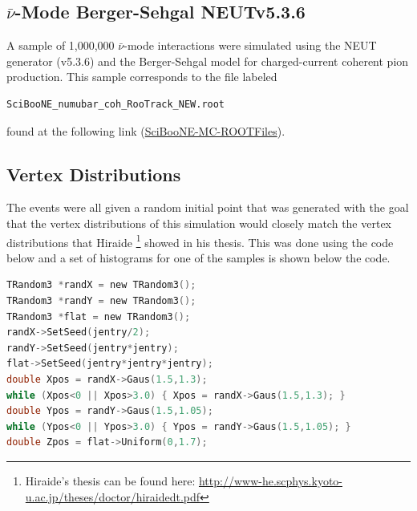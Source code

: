 \documentclass[11pt]{article}
\begin{document}
\subsection{$\bar{\nu}$-Mode Berger-Sehgal NEUTv5.3.6}
\label{sub:ANMBSv5.3.6}
A sample of 1,000,000 $\bar{\nu}$-mode interactions were simulated using the NEUT generator (v5.3.6) and the Berger-Sehgal model for charged-current coherent pion production. This sample corresponds to the file labeled
\begin{verbatim}
SciBooNE_numubar_coh_RooTrack_NEW.root
\end{verbatim}
found at the following link (\href{https://drive.google.com/open?id=0B4rvJl9swUOxcEtpSl94RDRsc3c}{SciBooNE-MC-ROOTFiles}).




\subsection{Vertex Distributions}
\label{sub:vertexdistribution}
The events were all given a random initial point that was generated with the goal that the vertex distributions of this simulation would closely match the vertex distributions that Hiraide \footnote{Hiraide's thesis can be found here: \href{http://www-he.scphys.kyoto-u.ac.jp/theses/doctor/hiraide_dt.pdf}{http://www-he.scphys.kyoto-u.ac.jp/theses/doctor/hiraide\textunderscore{}dt.pdf}} showed in his thesis. This was done using the code below and a set of histograms for one of the samples is shown below the code.

\begin{lstlisting}[language=C]
TRandom3 *randX = new TRandom3();
TRandom3 *randY = new TRandom3();
TRandom3 *flat = new TRandom3();
randX->SetSeed(jentry/2);
randY->SetSeed(jentry*jentry);
flat->SetSeed(jentry*jentry*jentry);
double Xpos = randX->Gaus(1.5,1.3);
while (Xpos<0 || Xpos>3.0) { Xpos = randX->Gaus(1.5,1.3); }
double Ypos = randY->Gaus(1.5,1.05);
while (Ypos<0 || Ypos>3.0) { Ypos = randY->Gaus(1.5,1.05); }
double Zpos = flat->Uniform(0,1.7);
\end{lstlisting}
\end{document}
